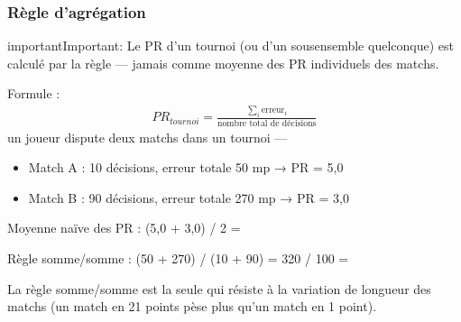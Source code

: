 \documentclass[letterpaper,10pt,french]{sphinxmanual}
\begin{document}
\subsubsection{Règle d’agrégation}
\label{\detokenize{manuel:regle-d-agregation}}
\begin{sphinxadmonition}{important}{Important:}
\sphinxAtStartPar
Le PR d’un tournoi (ou d’un sous\sphinxhyphen{}ensemble quelconque) est calculé par
la règle  — jamais comme moyenne des PR individuels des
matchs.

\sphinxAtStartPar
Formule :
\begin{equation*}
\begin{split}PR_{tournoi} = \frac{\sum_{i} \text{erreur}_i}{\text{nombre total de décisions}}\end{split}
\end{equation*}
\sphinxAtStartPar
{} un joueur dispute deux matchs dans un tournoi —
\begin{itemize}
\item {} 
\sphinxAtStartPar
Match A : 10 décisions, erreur totale 50 mp → PR = 5,0

\item {} 
\sphinxAtStartPar
Match B : 90 décisions, erreur totale 270 mp → PR = 3,0

\end{itemize}

\sphinxAtStartPar
Moyenne naïve des PR : (5,0 + 3,0) / 2 =  

\sphinxAtStartPar
Règle somme/somme : (50 + 270) / (10 + 90) = 320 / 100 =  

\sphinxAtStartPar
La règle somme/somme est la seule qui résiste à la variation de longueur
des matchs (un match en 21 points pèse plus qu’un match en 1 point).
\end{sphinxadmonition}
\end{document}
